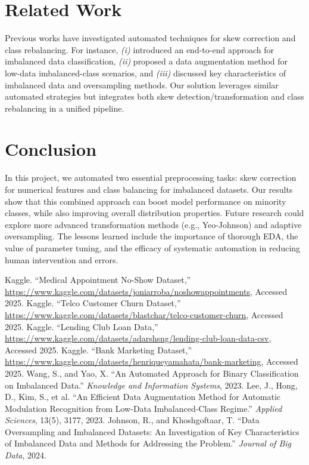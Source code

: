 \documentclass[11pt]{article}
\begin{document}
\section{Related Work}
Previous works have investigated automated techniques for skew correction and class rebalancing. 
For instance, \textit{(i)} \cite{binary_imbalance} introduced an end-to-end approach for imbalanced data classification, 
\textit{(ii)} \cite{sigaugment} proposed a data augmentation method for low-data imbalanced-class scenarios, 
and \textit{(iii)} \cite{oversampling_investigation} discussed key characteristics of imbalanced data and oversampling methods. 
Our solution leverages similar automated strategies but integrates both skew detection/transformation and class rebalancing in a unified pipeline.

\section{Conclusion}
In this project, we automated two essential preprocessing tasks: skew correction for numerical features and class balancing for imbalanced datasets. 
Our results show that this combined approach can boost model performance on minority classes, while also improving overall distribution properties. 
Future research could explore more advanced transformation methods (e.g., Yeo-Johnson) and adaptive oversampling. 
The lessons learned include the importance of thorough EDA, the value of parameter tuning, and the efficacy of systematic automation in reducing human intervention and errors.


\begin{thebibliography}{9}
 Kaggle. ``Medical Appointment No-Show Dataset,'' \url{https://www.kaggle.com/datasets/joniarroba/noshowappointments}, Accessed 2025.
 Kaggle. ``Telco Customer Churn Dataset,'' \url{https://www.kaggle.com/datasets/blastchar/telco-customer-churn}, Accessed 2025.
 Kaggle. ``Lending Club Loan Data,'' \url{https://www.kaggle.com/datasets/adarshsng/lending-club-loan-data-csv}, Accessed 2025.
 Kaggle. ``Bank Marketing Dataset,'' \url{https://www.kaggle.com/datasets/henriqueyamahata/bank-marketing}, Accessed 2025.
 Wang, S., and Yao, X. ``An Automated Approach for Binary Classification on Imbalanced Data.'' \textit{Knowledge and Information Systems}, 2023.
 Lee, J., Hong, D., Kim, S., et al. ``An Efficient Data Augmentation Method for Automatic Modulation Recognition from Low-Data Imbalanced-Class Regime.'' \textit{Applied Sciences}, 13(5), 3177, 2023.
 Johnson, R., and Khoshgoftaar, T. ``Data Oversampling and Imbalanced Datasets: An Investigation of Key Characteristics of Imbalanced Data and Methods for Addressing the Problem.'' \textit{Journal of Big Data}, 2024.
\end{thebibliography}
\end{document}
